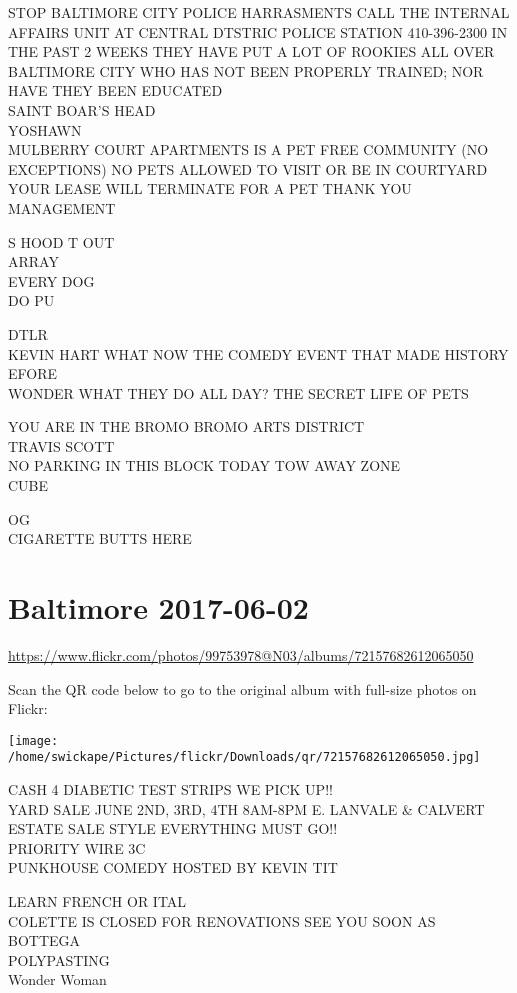 \documentclass[10pt,letterpaper]{article}
\begin{document}
STOP BALTIMORE CITY POLICE HARRASMENTS CALL THE INTERNAL AFFAIRS UNIT AT CENTRAL DTSTRIC POLICE STATION 410{-}396{-}2300 IN THE PAST 2 WEEKS THEY HAVE PUT A LOT OF ROOKIES ALL OVER BALTIMORE CITY WHO HAS NOT BEEN PROPERLY TRAINED; NOR HAVE THEY BEEN EDUCATED\\
SAINT BOAR'S HEAD\\
YOSHAWN\\
MULBERRY COURT APARTMENTS IS A PET FREE COMMUNITY (NO EXCEPTIONS) NO PETS ALLOWED TO VISIT OR BE IN COURTYARD YOUR LEASE WILL TERMINATE FOR A PET THANK YOU MANAGEMENT

S HOOD T OUT\\
ARRAY\\
EVERY DOG\\
DO PU

DTLR\\
KEVIN HART WHAT NOW THE COMEDY EVENT THAT MADE HISTORY\\
EFORE\\
WONDER WHAT THEY DO ALL DAY?  THE SECRET LIFE OF PETS

YOU ARE IN THE BROMO BROMO ARTS DISTRICT\\
TRAVIS SCOTT\\
NO PARKING IN THIS BLOCK TODAY TOW AWAY ZONE\\
CUBE

OG\\
CIGARETTE BUTTS HERE


\section*{Baltimore 2017-06-02}

\url{https://www.flickr.com/photos/99753978@N03/albums/72157682612065050}

Scan the QR code below to go to the original album with full-size photos on Flickr:

\texttt{[image: /home/swickape/Pictures/flickr/Downloads/qr/72157682612065050.jpg]}


CASH 4 DIABETIC TEST STRIPS WE PICK UP!!\\
YARD SALE JUNE 2ND, 3RD, 4TH 8AM{-}8PM E. LANVALE \& CALVERT ESTATE SALE STYLE EVERYTHING MUST GO!!\\
PRIORITY WIRE 3C\\
PUNKHOUSE COMEDY HOSTED BY KEVIN TIT

LEARN FRENCH OR ITAL\\
COLETTE IS CLOSED FOR RENOVATIONS SEE YOU SOON AS BOTTEGA\\
POLYPASTING\\
Wonder Woman
\end{document}
